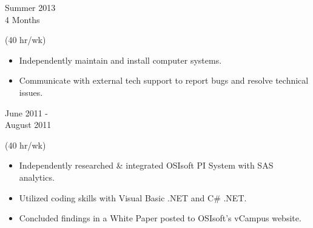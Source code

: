 %


\flushleft \begin{minipage}[t]{\dateColWidth}
Summer 2013 \\
4 Months
\end{minipage}
\begin{minipage}[t]{0.8\textwidth}
 (40 hr/wk) \\[-1 em]
\begin{adjustwidth}{2.5 em}{0 em}

\begin{itemize} \itemsep-2pt
\setlength{\itemindent}{-2 em}

\item Independently maintain and install computer systems.
\item Communicate with external tech support to report bugs and resolve technical issues.

\end{itemize}
\end{adjustwidth}
\end{minipage}

\divLine

\flushleft \begin{minipage}[t]{\dateColWidth}
June 2011 - \\[0.2 em]
August 2011
\end{minipage}
\begin{minipage}[t]{0.8\textwidth}
 (40 hr/wk) \\[-1 em]
\begin{adjustwidth}{2.5 em}{0 em} 

\begin{itemize} \itemsep-2pt
\setlength{\itemindent}{-2 em}

\item Independently researched \& integrated OSIsoft PI System with SAS analytics.
\item Utilized coding skills with Visual Basic .NET and C\# .NET.
\item Concluded findings in a White Paper posted to OSIsoft's vCampus website.
\end{itemize}

\end{adjustwidth}
\end{minipage}

